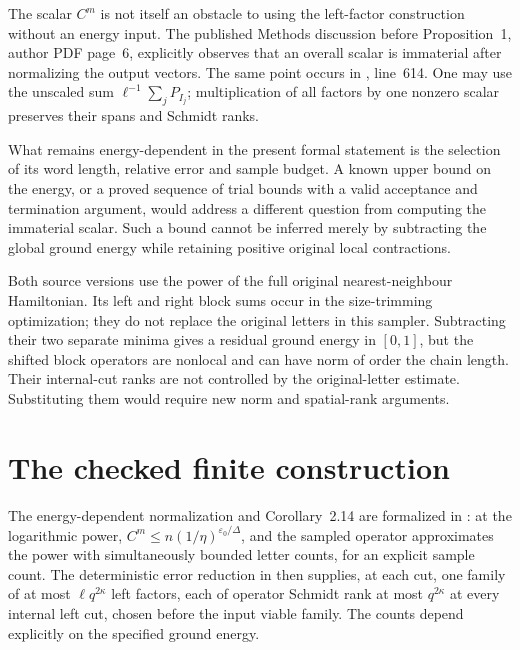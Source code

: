 \documentclass{article}
\begin{document}
The scalar $C^m$ is not itself an obstacle to using the left-factor
construction without an energy input. The published Methods discussion before Proposition~1,
author PDF page~6, explicitly observes that an overall scalar is immaterial after
normalizing the output vectors. The same point occurs in
, line~614. One may use the unscaled sum
$\ell^{-1}\sum_jP_{I_j}$; multiplication of all factors by one nonzero
scalar preserves their spans and Schmidt ranks.

What remains energy-dependent in the present formal statement is the
selection of its word length, relative error and sample budget.
A known upper bound on the energy, or a proved sequence of trial bounds
with a valid acceptance and termination argument, would address a different
question from computing the immaterial scalar. Such a bound cannot be
inferred merely by subtracting the global ground energy while retaining
positive original local contractions.

Both source versions use the power of the full original nearest-neighbour
Hamiltonian. Its left and right block sums occur in the size-trimming
optimization; they do not replace the original letters in this sampler.
Subtracting their two separate minima gives a residual ground energy in
$[0,1]$, but the shifted block operators are nonlocal and can have norm of
order the chain length. Their internal-cut ranks are not controlled by the
original-letter estimate. Substituting them would require new norm and
spatial-rank arguments.

\section{The checked finite construction}

The energy-dependent normalization and Corollary~2.14 are formalized in
: at the
logarithmic power, $C^m\le n(1/\eta)^{\varepsilon_0/\Delta}$, and the
sampled operator approximates the power with simultaneously bounded letter
counts, for an explicit sample count. The deterministic error reduction in
 then supplies,
at each cut, one family of at most $\ell q^{2\kappa}$ left factors, each of
operator Schmidt rank at most $q^{2\kappa}$ at every internal left cut, chosen
before the input viable family. The counts depend explicitly on the specified
ground energy.
\end{document}
